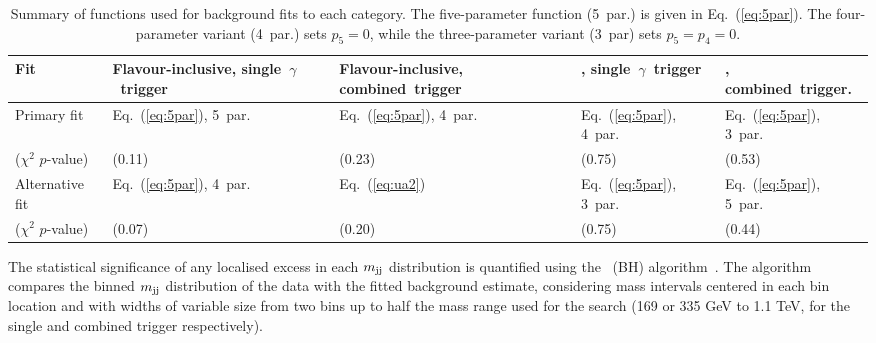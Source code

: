 \begin{table}
  \caption[]{Summary of functions used for background fits to each category.
    The five-parameter function (5~par.) is given in Eq.~(\ref{eq:5par}).
    The four-parameter variant (4~par.) sets $p_5 = 0$, while the three-parameter variant (3~par) sets $p_5 = p_4 = 0$.}
  \begin{tabularx}{\textwidth}{ l | *4{>{\centering\arraybackslash}X}@{}}
    \toprule
    \centering
		Fit               						        & Flavour-inclusive, single~$\gamma$~trigger     & Flavour-inclusive, combined~trigger 			& \btagged, single~$\gamma$~trigger   		   & \btagged, combined~trigger.        \\ \midrule
        Primary fit 								    & Eq.~(\ref{eq:5par}), 5~par.   & Eq.~(\ref{eq:5par}), 4~par. & Eq.~(\ref{eq:5par}), 4~par. & Eq.~(\ref{eq:5par}), 3~par. \\
        ($\chi^2$ $p$-value)       						& (0.11) 					    & (0.23)  					  &  (0.75)  				    & (0.53) 					  \\ \midrule
        Alternative fit 							    & Eq.~(\ref{eq:5par}), 4~par.	& Eq.~(\ref{eq:ua2}) 		  & Eq.~(\ref{eq:5par}), 3~par. & Eq.~(\ref{eq:5par}), 5~par.\\ 
 	    ($\chi^2$ $p$-value)       						& (0.07) 					    & (0.20)  					  &  (0.75)  				    & (0.44) 					  \\ \bottomrule
 	\end{tabularx}
    \label{tab:fitsummary}
\end{table}

The statistical significance of any localised excess in each $m_{\textrm{jj}}$ distribution is quantified using the \BumpHunter~(BH) algorithm~\cite{Aaltonen:2008vt,Choudalakis:2011bh}.
The algorithm compares the binned $m_{\textrm{jj}}$ distribution of the data with the fitted background estimate, considering mass intervals centered in each bin location and with widths of variable size from two bins up to half the mass range used for the search (169 or 335 GeV to 1.1 TeV, for the single and combined trigger respectively). 

